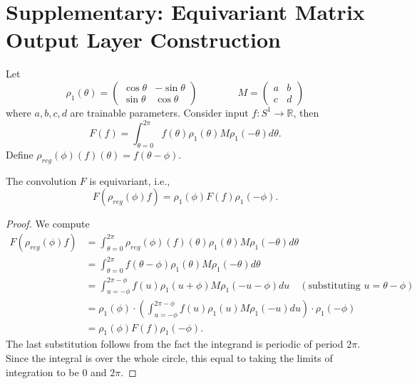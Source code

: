 \section{Supplementary: Equivariant Matrix Output Layer Construction}
\label{app:matrix}

Let 
\[
    \rho_1(\theta) = \begin{pmatrix}
    \cos{\theta} & -\sin{\theta} \\
    \sin{\theta} & \cos{\theta}
    \end{pmatrix} 
    \qquad\qquad
        M = \begin{pmatrix}
    a & b \\
    c & d
    \end{pmatrix}
\]
where $a,b,c,d$ are trainable parameters.
Consider input $f \colon S^1 \to \mathbb{R}$, then
\[
F(f) = \int_{\theta=0}^{2\pi} f(\theta) \rho_1(\theta) M \rho_1(-\theta) d\theta.
\]
Define $\rho_{reg}(\phi)(f)(\theta) = f(\theta-\phi)$.  
\vspace{5px}
\begin{prop*}
The convolution $F$ is equivariant, i.e.,
\[
F(\rho_{reg}(\phi) f) = \rho_1(\phi) F(f) \rho_1(-\phi).
\]
\end{prop*}
\begin{proof}
We compute
\begin{align*}
    F(\rho_{reg} (\phi)f) 
    &= \int_{\theta=0}^{2\pi}  \rho_{reg}(\phi)(f)(\theta) \rho_1(\theta) M\rho_1(-\theta) d \theta \\
    &= \int_{\theta=0}^{2\pi}  f(\theta-\phi) \rho_1(\theta) M\rho_1(-\theta) d \theta \\
    &= \int_{u=-\phi}^{2\pi-\phi} f(u) \rho_1(u+\phi)M\rho_1(-u-\phi)du \quad (\text{substituting } u = \theta - \phi) \\ 
    &= \rho_1(\phi) \cdot \left( \int_{u=-\phi}^{2\pi-\phi} f(u) \rho_1(u)M\rho_1(-u)du \right) \cdot \rho_1(-\phi) \\
    &=  \rho_1(\phi) F(f) \rho_1(-\phi). 
\end{align*} 
The last substitution follows from the fact the integrand is periodic of period $2\pi$. Since the integral is over the whole circle, this equal to taking the limits of integration to be $0$ and $2\pi$.
\end{proof}

\vspace{3px}

